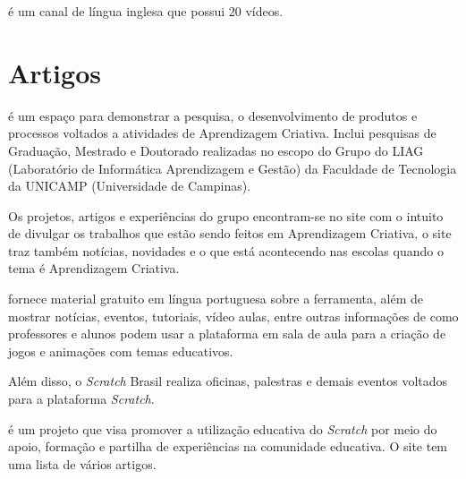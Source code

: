 \documentclass[12pt,fleqn]{book} %
\begin{document}
\textcite{blank2018} é um canal de língua inglesa que possui 20 vídeos.

\section{Artigos}

\textcite{liag2018} é um espaço para demonstrar a pesquisa, o desenvolvimento de produtos e processos voltados a atividades de Aprendizagem Criativa. Inclui pesquisas de Graduação, Mestrado e Doutorado realizadas no escopo do Grupo do LIAG (Laboratório de Informática Aprendizagem e Gestão) da Faculdade de Tecnologia da UNICAMP (Universidade de Campinas). 

Os projetos, artigos e experiências do grupo encontram-se no site com o intuito de divulgar os trabalhos que estão sendo feitos em Aprendizagem Criativa, o site traz também notícias, novidades e o que está acontecendo nas escolas quando o tema é Aprendizagem Criativa.

\textcite{scratchbrasil2018} fornece material gratuito em língua portuguesa sobre a ferramenta, além de mostrar notícias, eventos, tutoriais, vídeo aulas, entre outras informações de como professores e alunos podem usar a plataforma em sala de aula para a criação de jogos e animações com temas educativos.

Além disso, o \textit{Scratch} Brasil realiza oficinas, palestras e demais eventos voltados para a plataforma \textit{Scratch}.

\textcite{eduscratch2018} é um projeto que visa promover a utilização educativa do \textit{Scratch} por meio do apoio, formação e partilha de experiências na comunidade educativa. O site tem uma lista de vários artigos. 




\end{document}
